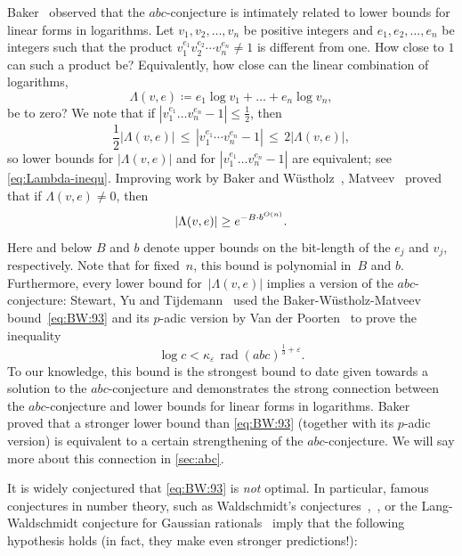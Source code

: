 \documentclass[10pt,a4paper]{article}
\theoremstyle{definition}
\DeclareMathOperator{\rad}{rad}
\newcommand{\abc}{\texorpdfstring{$abc$}{abc}}
\DeclarePairedDelimiter\abs{\lvert}{\rvert}
\numberwithin{equation}{section}
\begin{document}
Baker~\cite{baker98} observed that the \abc-conjecture is intimately related to lower bounds
for linear forms in logarithms.
Let $v_1,v_2,\dots,v_n$ be positive integers and $e_1,e_2,\dots,e_n$ be integers such that
the product $v_1^{e_1} v_2^{e_2}\cdots v_n^{e_n}\neq 1$ is different from one.
How close to $1$ can such a product be?
Equivalently, how close can the linear combination of logarithms,
\begin{equation}\label{eq:def-Lambda(v,e)}
  \Lambda(v,e) \coloneqq e_1\log v_1 +\ldots + e_n \log v_n ,
\end{equation}
be to zero?
We note that if
$|v_1^{e_1}\dots v_n^{e_n}-1|\leq \frac{1}{2}$,
then
\[
  \frac{1}{2} |\Lambda(v,e)| \, \leq \, |v_1^{e_1} \cdots v_n^{e_n}-1| \, \leq \, 2 |\Lambda(v,e)| ,
\]
so lower bounds for $|\Lambda(v,e)|$ and for $|v_1^{e_1}\dots v_n^{e_n}-1|$ are equivalent;
see \cref{eq:Lambda-inequ}.
Improving work by Baker and W\"ustholz~\cite{wustholz1993}, Matveev~\cite{matveev} proved that
if $\Lambda(v,e)\ne 0$, then
\begin{equation}\label{eq:BW:93}
  \abs{ \Lambda(v,e) } \ge e^{-B \cdot b^{O(n)}}.
\end{equation}
Here and below $B$ and $b$ denote upper bounds on the bit-length of the $e_j$ and $v_j$, respectively.
Note that for fixed~$n$, this bound is polynomial in~$B$ and $b$.
Furthermore, every lower bound for~$|\Lambda(v,e)|$ implies a version of the \abc-conjecture:
Stewart, Yu and Tijdemann~\cite{yu-stewart, stewart_oesterle-masser_1986}
used the Baker-W\"{u}stholz-Matveev bound~\eqref{eq:BW:93} and its $p$-adic version by Van der Poorten~\cite{vdpoorten}
to prove the inequality
\[
  \log c < \kappa_\varepsilon\, \rad(abc)^{\frac{1}{3}+\varepsilon}.
\]
To our knowledge, this bound is the strongest bound to date given towards a solution to
the \abc-conjecture and demonstrates the strong connection between the \abc-conjecture and
lower bounds for linear forms in logarithms.
Baker~\cite{baker98} proved that a stronger lower bound than \eqref{eq:BW:93}
(together with its $p$-adic version)
is equivalent to a certain strengthening of the \abc-conjecture.
We will say more about this connection in \cref{sec:abc}.

It is widely conjectured that \eqref{eq:BW:93} is \emph{not} optimal.
In particular, famous conjectures in number theory,
such as Waldschmidt's conjectures~\cite[Conjecture~14.25, p.~547]{waldschmidt-2},~\cite[Conjecture~4.14]{waldschmidt-1},
or the Lang-Waldschmidt conjecture
for Gaussian rationals~\cite[Introduction to Chapters~X and~XI]{lang-elliptic-curves}
imply that the following hypothesis holds (in fact, they make even stronger predictions!):
\end{document}
